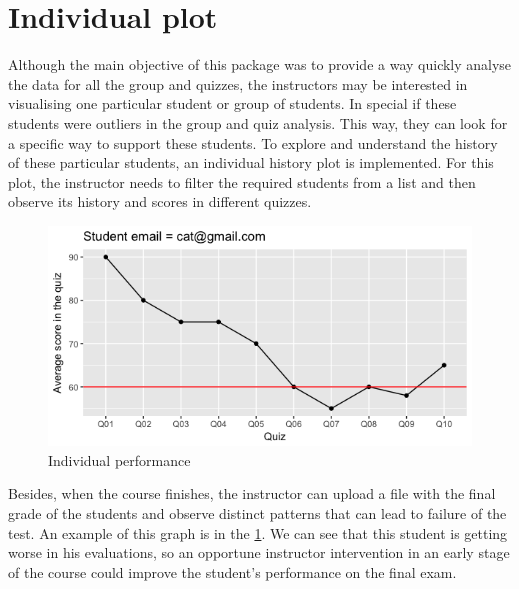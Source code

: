 \section{Individual plot}

Although the main objective of this package was to provide a way quickly analyse the data for all the group and quizzes, the instructors may be interested in visualising one particular student or group of students. In special if these students were outliers in the group and quiz analysis. This way, they can look for a specific way to support these students. To explore and understand the history of these particular students, an individual history plot is implemented. For this plot, the instructor needs to filter the required students from a list and then observe its history and scores in different quizzes. 

\begin{figure}[ht!]
  \centering
  \includegraphics[width=\linewidth]{img/ind_student.png}
  \caption{Individual performance}
  \label{img:ind_student}
\end{figure}

Besides, when the course finishes, the instructor can upload a file with the final grade of the students and observe distinct patterns that can lead to failure of the test. An example of this graph is in the \cref{img:ind_student}. We can see that this student is getting worse in his evaluations, so an opportune instructor intervention in an early stage of the course could improve the student's performance on the final exam.

